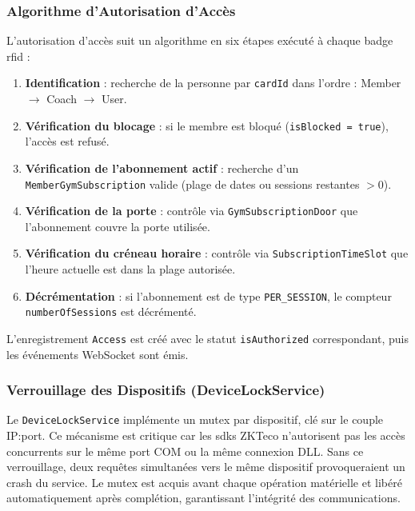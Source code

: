 ﻿\documentclass[../main.tex]{subfiles}
\begin{document}
\subsubsection{Algorithme d'Autorisation d'Acc\`{e}s}

L'autorisation d'acc\`{e}s suit un algorithme en six \'{e}tapes ex\'{e}cut\'{e} \`{a} chaque badge \acrshort{rfid} :

\begin{enumerate}
  \item \textbf{Identification} : recherche de la personne par \texttt{cardId} dans l'ordre : Member $\rightarrow$ Coach $\rightarrow$ User.
  \item \textbf{V\'{e}rification du blocage} : si le membre est bloqu\'{e} (\texttt{isBlocked = true}), l'acc\`{e}s est refus\'{e}.
  \item \textbf{V\'{e}rification de l'abonnement actif} : recherche d'un \texttt{MemberGymSubscription} valide (plage de dates ou sessions restantes $> 0$).
  \item \textbf{V\'{e}rification de la porte} : contr\^{o}le via \texttt{GymSubscriptionDoor} que l'abonnement couvre la porte utilis\'{e}e.
  \item \textbf{V\'{e}rification du cr\'{e}neau horaire} : contr\^{o}le via \texttt{SubscriptionTimeSlot} que l'heure actuelle est dans la plage autoris\'{e}e.
  \item \begin{sloppypar}\textbf{D\'{e}cr\'{e}mentation} : si l'abonnement est de type \texttt{PER\_SESSION}, le compteur \texttt{numberOfSessions} est d\'{e}cr\'{e}ment\'{e}.\end{sloppypar}
\end{enumerate}

\begin{sloppypar}
L'enregistrement \texttt{Access} est cr\'{e}\'{e} avec le statut \texttt{isAuthorized} correspondant, puis les \'{e}v\'{e}nements WebSocket sont \'{e}mis.
\end{sloppypar}

\subsubsection{Verrouillage des Dispositifs (DeviceLockService)}

Le \texttt{DeviceLockService} impl\'{e}mente un mutex par dispositif, cl\'{e} sur le couple IP:port. Ce m\'{e}canisme est critique car les \acrshort{sdk}s ZKTeco n'autorisent pas les acc\`{e}s concurrents sur le m\^{e}me port COM ou la m\^{e}me connexion DLL. Sans ce verrouillage, deux requ\^{e}tes simultan\'{e}es vers le m\^{e}me dispositif provoqueraient un crash du service. Le mutex est acquis avant chaque op\'{e}ration mat\'{e}rielle et lib\'{e}r\'{e} automatiquement apr\`{e}s compl\'{e}tion, garantissant l'int\'{e}grit\'{e} des communications.
\end{document}
